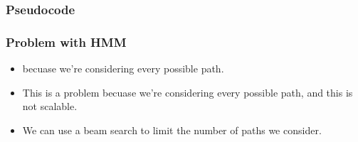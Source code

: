 \documentclass[11pt]{article}
\begin{document}
\subsubsection{Pseudocode}

\begin{figure}[H]
    \centering
\end{figure}    

\subsubsection{Problem with HMM}

\begin{minipage}[l]{.5\linewidth}
    \begin{figure}[H]
        \centering
    \end{figure}    
\end{minipage}\hfill
\begin{minipage}[r]{.48\linewidth}
    \begin{itemize}
        \item becuase we're considering every possible path. 
        \item This is a problem becuase we're considering every possible path, and this is not scalable.
        \item We can use a beam search to limit the number of paths we consider.
    \end{itemize}
\end{minipage}
\end{document}

